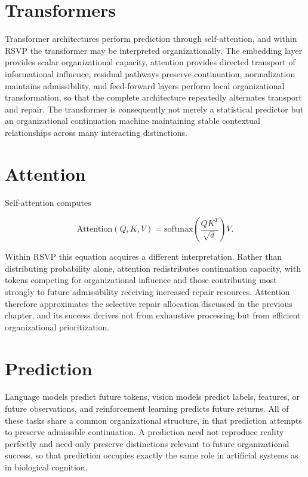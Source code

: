 \documentclass[11pt,oneside]{book}
\numberwithin{equation}{chapter}
\theoremstyle{definition}
\theoremstyle{plain}
\begin{document}
\section{Transformers}

Transformer architectures perform prediction through self-attention, and within RSVP the transformer may be interpreted organizationally. The embedding layer provides scalar organizational capacity, attention provides directed transport of informational influence, residual pathways preserve continuation, normalization maintains admissibility, and feed-forward layers perform local organizational transformation, so that the complete architecture repeatedly alternates transport and repair. The transformer is consequently not merely a statistical predictor but an organizational continuation machine maintaining stable contextual relationships across many interacting distinctions.

\section{Attention}

Self-attention computes

\[
\mathrm{Attention}(Q,K,V)
=
\mathrm{softmax}
\left(
\frac{QK^T}
{\sqrt d}
\right)V.
\]

Within RSVP this equation acquires a different interpretation. Rather than distributing probability alone, attention redistributes continuation capacity, with tokens competing for organizational influence and those contributing most strongly to future admissibility receiving increased repair resources. Attention therefore approximates the selective repair allocation discussed in the previous chapter, and its success derives not from exhaustive processing but from efficient organizational prioritization.

\section{Prediction}

Language models predict future tokens, vision models predict labels, features, or future observations, and reinforcement learning predicts future returns. All of these tasks share a common organizational structure, in that prediction attempts to preserve admissible continuation. A prediction need not reproduce reality perfectly and need only preserve distinctions relevant to future organizational success, so that prediction occupies exactly the same role in artificial systems as in biological cognition.
\end{document}
